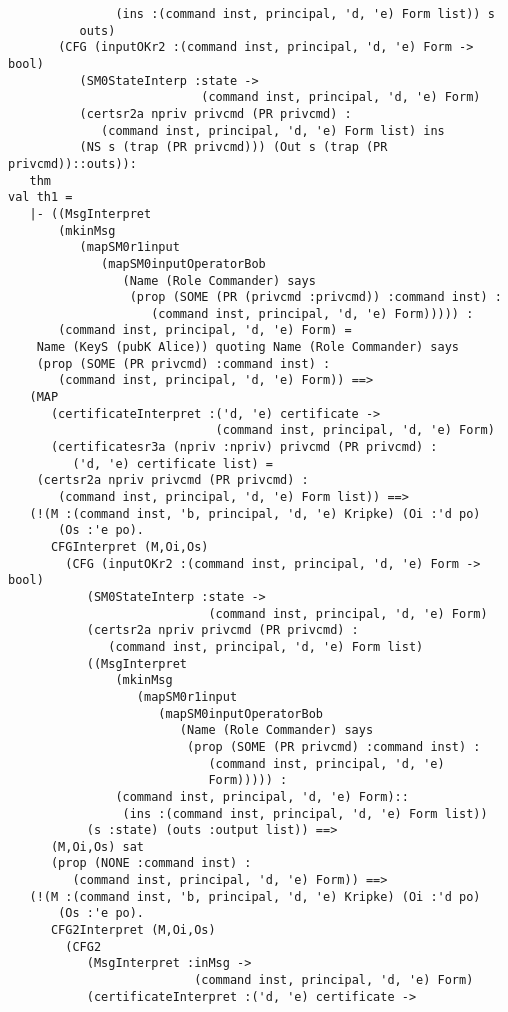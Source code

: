 \documentclass{report}
\begin{document}
\begin{session}
\begin{scriptsize}
\begin{verbatim}
               (ins :(command inst, principal, 'd, 'e) Form list)) s
          outs)
       (CFG (inputOKr2 :(command inst, principal, 'd, 'e) Form -> bool)
          (SM0StateInterp :state ->
                           (command inst, principal, 'd, 'e) Form)
          (certsr2a npriv privcmd (PR privcmd) :
             (command inst, principal, 'd, 'e) Form list) ins
          (NS s (trap (PR privcmd))) (Out s (trap (PR privcmd))::outs)):
   thm
val th1 =
   |- ((MsgInterpret
       (mkinMsg
          (mapSM0r1input
             (mapSM0inputOperatorBob
                (Name (Role Commander) says
                 (prop (SOME (PR (privcmd :privcmd)) :command inst) :
                    (command inst, principal, 'd, 'e) Form))))) :
       (command inst, principal, 'd, 'e) Form) =
    Name (KeyS (pubK Alice)) quoting Name (Role Commander) says
    (prop (SOME (PR privcmd) :command inst) :
       (command inst, principal, 'd, 'e) Form)) ==>
   (MAP
      (certificateInterpret :('d, 'e) certificate ->
                             (command inst, principal, 'd, 'e) Form)
      (certificatesr3a (npriv :npriv) privcmd (PR privcmd) :
         ('d, 'e) certificate list) =
    (certsr2a npriv privcmd (PR privcmd) :
       (command inst, principal, 'd, 'e) Form list)) ==>
   (!(M :(command inst, 'b, principal, 'd, 'e) Kripke) (Oi :'d po)
       (Os :'e po).
      CFGInterpret (M,Oi,Os)
        (CFG (inputOKr2 :(command inst, principal, 'd, 'e) Form -> bool)
           (SM0StateInterp :state ->
                            (command inst, principal, 'd, 'e) Form)
           (certsr2a npriv privcmd (PR privcmd) :
              (command inst, principal, 'd, 'e) Form list)
           ((MsgInterpret
               (mkinMsg
                  (mapSM0r1input
                     (mapSM0inputOperatorBob
                        (Name (Role Commander) says
                         (prop (SOME (PR privcmd) :command inst) :
                            (command inst, principal, 'd, 'e)
                            Form))))) :
               (command inst, principal, 'd, 'e) Form)::
                (ins :(command inst, principal, 'd, 'e) Form list))
           (s :state) (outs :output list)) ==>
      (M,Oi,Os) sat
      (prop (NONE :command inst) :
         (command inst, principal, 'd, 'e) Form)) ==>
   (!(M :(command inst, 'b, principal, 'd, 'e) Kripke) (Oi :'d po)
       (Os :'e po).
      CFG2Interpret (M,Oi,Os)
        (CFG2
           (MsgInterpret :inMsg ->
                          (command inst, principal, 'd, 'e) Form)
           (certificateInterpret :('d, 'e) certificate ->

\end{verbatim}
\end{scriptsize}
\end{session}
\end{document}
